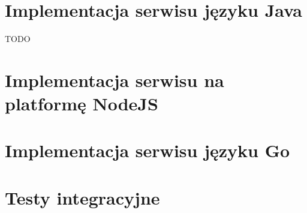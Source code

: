 \documentclass[a4paper,12pt,twoside,openany]{report}
\begin{document}
\appendix
\chapter{Implementacja serwisu języku Java}
TODO
\chapter{Implementacja serwisu na platformę NodeJS}
\chapter{Implementacja serwisu języku Go}
\chapter{Testy integracyjne}

\begin{thebibliography}{99}

\end{thebibliography}

\zakonczenie  %
\end{document}
